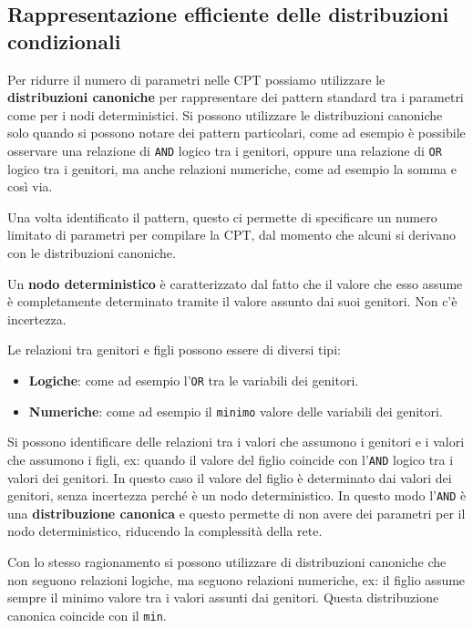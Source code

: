 \subsection{Rappresentazione efficiente delle distribuzioni condizionali}
Per ridurre il numero di parametri nelle CPT possiamo utilizzare le \textbf{distribuzioni
    canoniche} per rappresentare dei pattern standard tra i parametri come per
i nodi deterministici. Si possono utilizzare le distribuzioni canoniche solo
quando si possono notare dei pattern particolari, come ad esempio è possibile
osservare una relazione di \texttt{AND} logico tra i genitori, oppure una relazione
di \texttt{OR} logico tra i genitori, ma anche relazioni numeriche, come ad esempio
la somma e così via.

Una volta identificato il pattern, questo ci permette di specificare un numero
limitato di parametri per compilare la CPT, dal momento che alcuni si derivano
con le distribuzioni canoniche.
\begin{definizione}
    Un \textbf{nodo deterministico} è caratterizzato dal fatto che il valore che
    esso assume è completamente determinato tramite il valore assunto dai suoi
    genitori. Non c'è incertezza.
\end{definizione}
Le relazioni tra genitori e figli possono essere di diversi tipi:
\begin{itemize}
    \item \textbf{Logiche}: come ad esempio l'\texttt{OR} tra le variabili dei
          genitori.
    \item \textbf{Numeriche}: come ad esempio il \texttt{minimo} valore delle
          variabili dei genitori.
\end{itemize}

Si possono identificare delle relazioni tra i valori che assumono i genitori e
i valori che assumono i figli, ex: quando il valore del figlio coincide con l'\texttt{AND}
logico tra i valori dei genitori. In questo caso il valore del figlio è determinato
dai valori dei genitori, senza incertezza perché è un nodo deterministico. In questo
modo l'\texttt{AND} è una \textbf{distribuzione canonica} e questo permette di
non avere dei parametri per il nodo deterministico, riducendo la complessità
della rete.

Con lo stesso ragionamento si possono utilizzare di distribuzioni canoniche che non
seguono relazioni logiche, ma seguono relazioni numeriche, ex: il figlio assume
sempre il minimo valore tra i valori assunti dai genitori.  Questa distribuzione
canonica coincide con il \texttt{min}.

